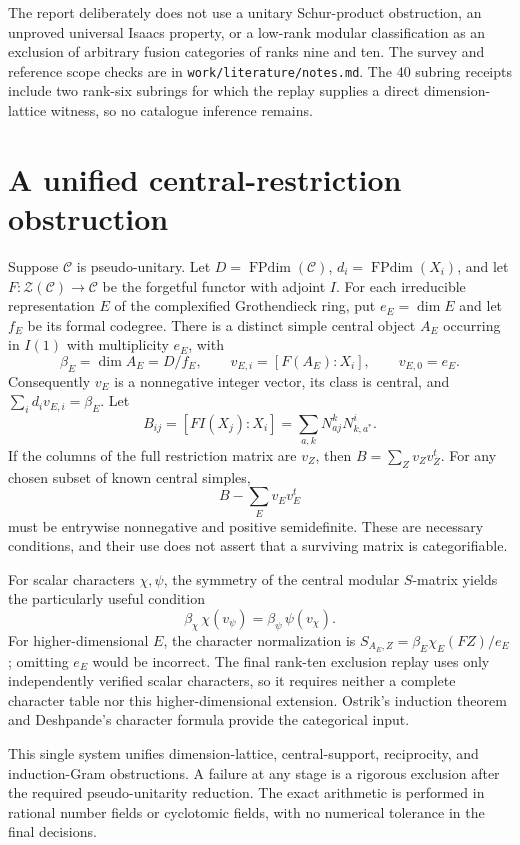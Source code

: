 \documentclass[11pt]{article}
\newcommand{\FPdim}{\operatorname{FPdim}}
\theoremstyle{remark}\newtheorem{remark}[proposition]{Remark}
\begin{document}
The report deliberately does not use a unitary Schur-product obstruction,
an unproved universal Isaacs property, or a low-rank modular classification
as an exclusion of arbitrary fusion categories of ranks nine and ten.
The survey and reference scope checks are in \nolinkurl{work/literature/notes.md}.
The 40 subring receipts include two rank-six subrings for which the replay
supplies a direct dimension-lattice witness, so no catalogue inference remains.

\section{A unified central-restriction obstruction}
Suppose $\mathcal C$ is pseudo-unitary. Let $D=\FPdim(\mathcal C)$,
$d_i=\FPdim(X_i)$, and let $F:\mathcal Z(\mathcal C)\to\mathcal C$ be the
forgetful functor with adjoint $I$. For each irreducible representation $E$
of the complexified Grothendieck ring, put $e_E=\dim E$ and let $f_E$ be its
formal codegree. There is a distinct simple central object $A_E$ occurring
in $I(1)$ with multiplicity $e_E$, with
\[
 \beta_E=\dim A_E=D/f_E,\qquad
 v_{E,i}=[F(A_E):X_i],\qquad v_{E,0}=e_E.
\]
Consequently $v_E$ is a nonnegative integer vector, its class is central,
and $\sum_i d_iv_{E,i}=\beta_E$. Let
\[
 B_{ij}=[F I(X_j):X_i]
       =\sum_{a,k}N_{aj}^{k}N_{k,a^*}^{i}.
\]
If the columns of the full restriction matrix are $v_Z$, then
$B=\sum_Zv_Zv_Z^t$. For any chosen subset of known central simples,
\[
 B-\sum_Ev_Ev_E^t
\]
must be entrywise nonnegative and positive semidefinite. These are necessary
conditions, and their use does not assert that a surviving matrix is
categorifiable.

For scalar characters $\chi,\psi$, the symmetry of the central modular
$S$-matrix yields the particularly useful condition
\[
 \beta_\chi\,\chi(v_\psi)=\beta_\psi\,\psi(v_\chi).
\]
For higher-dimensional $E$, the character normalization is
$S_{A_E,Z}=\beta_E\chi_E(FZ)/e_E$; omitting $e_E$ would be incorrect.
The final rank-ten exclusion replay uses only independently verified scalar
characters, so it requires neither a complete character table nor this
higher-dimensional extension. Ostrik's induction theorem
\cite[Theorem~2.13]{Ostrik3} and Deshpande's character formula
\cite[Equations~(35)--(36)]{Deshpande} provide the categorical input.

This single system unifies dimension-lattice, central-support, reciprocity,
and induction-Gram obstructions. A failure at any stage is a rigorous
exclusion after the required pseudo-unitarity reduction. The exact arithmetic
is performed in rational number fields or cyclotomic fields, with no numerical
tolerance in the final decisions.
\end{document}
